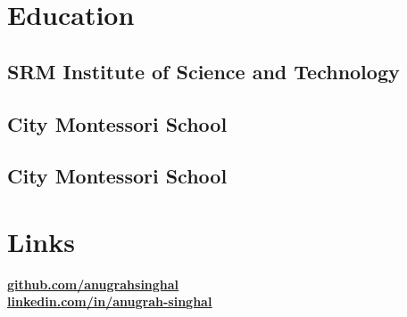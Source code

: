 \documentclass[]{deedy-resume-openfont}
\begin{document}
%
%
\lastupdated

%
%

%
%

\begin{minipage}[t]{0.33\textwidth} 


\section{Education} 

\subsection{SRM Institute of Science and Technology}
\sectionsep

\subsection{City Montessori School}
\sectionsep
\subsection{City Montessori School}
\sectionsep


\section{Links} 
\href{https://github.com/anugrahsinghal}{\textbf{\underline{github.com/anugrahsinghal}}} \\
\href{https://www.linkedin.com/in/anugrah-singhal}{\textbf{\underline{linkedin.com/in/anugrah-singhal}}}


\end{minipage}
\end{document}
